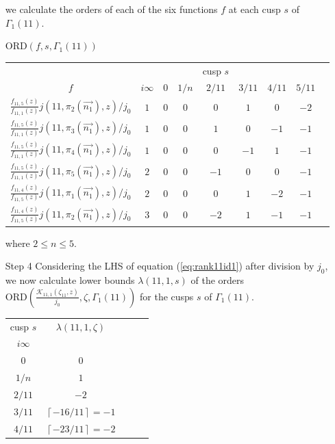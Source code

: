 \documentclass[12pt]{amsart}
\theoremstyle{definition}
\theoremstyle{remark}
\numberwithin{equation}{section}
\newcommand\CL[1]{\left\lceil#1\right\rceil}
\newcommand\ORD{\mbox{ORD}}
\newcommand\eqn[1]{(\ref{eq:#1})}
\begin{document}
\begin{enumerate}
 we calculate the orders of each of the six functions $f$ at each cusp 
$s$ of 
$\Gamma_1(11)$.
\begin{center}
$\ORD(f,s,\Gamma_1(11))$\\
\begin{tabular}{c c c c c c c c c}\\
 &&&& cusp $s$  \\
$f$ & $i\infty$ & $0$ & $1/n$ & $2/11$ & $3/11$ & $4/11$ & $5/11$  \\
$\frac{f_{11,5}(z)}{f_{11,1}(z)}j(11,\pi_2(\overrightarrow{n_1}),z)/j_0$ &  $1$  & $0$ & $0$   & $0$    & $1$    &  $0$   &  $-2$   \\
$\frac{f_{11,5}(z)}{f_{11,1}(z)}j(11,\pi_3(\overrightarrow{n_1}),z)/j_0$ &  $1$  & $0$ & $0$   & $1$    & $0$    &  $-1$   &  $-1$   \\
$\frac{f_{11,5}(z)}{f_{11,1}(z)}j(11,\pi_4(\overrightarrow{n_1}),z)/j_0$ &  $1$  & $0$ & $0$   & $0$    & $-1$   &  $1$   &  $-1$   \\
$\frac{f_{11,5}(z)}{f_{11,1}(z)}j(11,\pi_5(\overrightarrow{n_1}),z)/j_0$ &  $2$  & $0$ & $0$   & $-1$   & $0$    &  $0$   &  $-1$   \\
$\frac{f_{11,4}(z)}{f_{11,5}(z)}j(11,\pi_1(\overrightarrow{n_1}),z)/j_0$ &  $2$  & $0$ & $0$   & $0$    & $1$    &  $-2$   &  $-1$   \\
$\frac{f_{11,4}(z)}{f_{11,5}(z)}j(11,\pi_2(\overrightarrow{n_1}),z)/j_0$ &  $3$  & $0$ & $0$   & $-2$    & $1$   &  $-1$   &  $-1$               
\end{tabular}
\end{center}
where $2\le n\le 5$.
\item[Step 4] Considering the LHS of equation \eqn{rank11id1}
after division by $j_0$, 
we now calculate lower bounds $\lambda(11,1,s)$ of 
the  orders 
$\ORD\left(\frac{\mathcal{K}_{11,1}(\zeta_{11},z)}{j_0},\zeta,\Gamma_1(11)\right)$
for the cusps $s$ of $\Gamma_1(11)$.
\begin{center}
\begin{tabular}{c c c c c}
cusp $s$ & $\lambda(11,1,\zeta)$     \\
$i\infty$    &                     \\
$0$          &   $0$               \\
$1/n$        &   $1$               \\
$2/11$       &   $-2$  \\
$3/11$       &   $\CL{-16/11}=-1$  \\
$4/11$       &   $\CL{-23/11}=-2$  \\

\end{tabular}
\end{center}
\end{enumerate}
\end{document}
